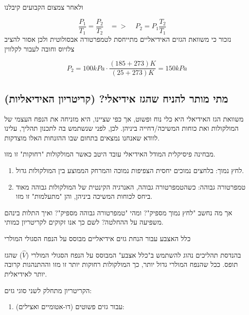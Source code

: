 \documentclass[
  hebrew,
  letterpaper,
  DIV=11,
  numbers=noendperiod]{scrreprt}
\providecommand{\tightlist}{%
  \setlength{\itemsep}{0pt}\setlength{\parskip}{0pt}}
\begin{document}
ולאחר צמצום הקבועים קיבלנו

\[\frac{P_{1}}{T_{1}} = \frac{P_{2}}{T_{2}}\ \ \ \  = > \ \ \ \ \ P_{2} = P_{1}\frac{T_{2}}{T_{1}}\ \ \ \ \ \ \]
נזכור כי משוואת הגזים האידיאליים מתייחסת לטמפרטורה אבסולוטית ולכן אסור
להציב צלזיוס וחובה לעבור לקלווין

\[P_{2} = 100kPa \cdot \frac{(185 + 273)K}{(25 + 273)K} = 150kPa\]

\subsection{מתי מותר להניח שהגז אידיאלי? (קריטריון
האידיאליות)}\label{ux5deux5eaux5d9-ux5deux5d5ux5eaux5e8-ux5dcux5d4ux5e0ux5d9ux5d7-ux5e9ux5d4ux5d2ux5d6-ux5d0ux5d9ux5d3ux5d9ux5d0ux5dcux5d9-ux5e7ux5e8ux5d9ux5d8ux5e8ux5d9ux5d5ux5df-ux5d4ux5d0ux5d9ux5d3ux5d9ux5d0ux5dcux5d9ux5d5ux5ea}

משוואת הגז האידיאלי היא כלי נוח ופשוט, אך כפי שציינו, היא מזניחה את הנפח
העצמי של המולקולות ואת כוחות המשיכה/דחייה ביניהן. לכן, לפני שנשתמש בה
לתכנון תהליך, עלינו לוודא שאנחנו נמצאים בתחום שבו ההזנחות האלו מוצדקות.

מבחינה פיסיקלית המודל האידיאלי עובד היטב כאשר המולקולות "רחוקות" זו מזו.

\begin{enumerate}
\def\labelenumi{\arabic{enumi}.}
\item
  לחץ נמוך: בלחצים נמוכים יחסית הצפיפות נמוכה והמרחק הממוצע בין
  המולקולות גדול.
\item
  טמפרטורה גבוהה: כשהטמפרטורה גבוהה, האנרגיה הקינטית של המולקולות גבוהה
  מאוד ביחס לכוחות המשיכה ביניהן, והן "מתעלמות" זו מזו.
\end{enumerate}

אך מה נחשב "לחץ נמוך מספיק"? ומהי "טמפרטורה גבוהה מספיק"? ואיך התלות
בינהם משפיעה על ההחלטה? לשם כך אנו זקוקים לקריטריון כמותי.

כלל האצבע עבור הנחת גזים אידיאליים מבוסס על הנפח הסגולי המולרי

בהנדסת תהליכים נהוג להשתמש ב"כלל אצבע" המבוסס על הנפח הסגולי המולרי
(\(\widehat{V}\)) שהגז תופס. ככל שהנפח המולרי גדול יותר, כך המולקולות
רחוקות יותר זו מזו וההתנהגות קרובה יותר לאידיאלית.

הקריטריון מתחלק לשני סוגי גזים:

\begin{enumerate}
\def\labelenumi{\arabic{enumi}.}
\tightlist
\item
  עבור גזים פשוטים (דו-אטומיים ואצילים):
\end{enumerate}
\end{document}
